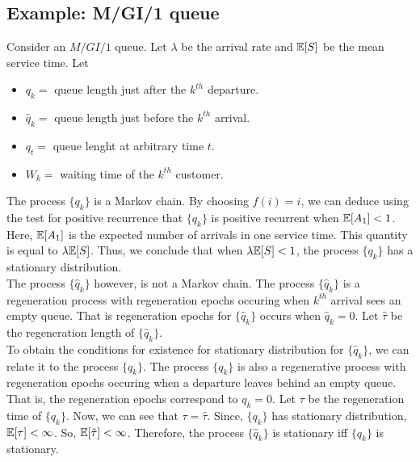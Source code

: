 \documentclass[all-lectures.tex]{subfiles}
\begin{document}

\setcounter{section}{4}
\setcounter{subsection}{0}

\section*{}
\subsection{Example: M/GI/1 queue}
Consider an $M/GI/1$ queue. Let $\lambda$  be the arrival rate and $\mathbb{E}[S]$ be the mean service time. Let 
\begin{itemize}
\item $q_k = $ queue length just after the $k^{th}$ departure. 
\item $\hat{q}_k = $ queue length just before the $k^{th}$ arrival. 
\item $q_t =$ queue lenght at arbitrary time $t$.
\item $W_k = $ waiting time of the $k^{th}$ customer.
\end{itemize}
The process $\{q_k\}$ is a Markov chain. By choosing $f(i) = i$, we can deduce using the test for positive recurrence that $\{q_k\}$ is positive recurrent when $\mathbb{E}[A_1] < 1$. Here, $\mathbb{E}[A_1]$ is the expected number of arrivals in one service time. This quantity is equal to $\lambda \mathbb{E}[S]$. Thus, we conclude that when $\lambda \mathbb{E}[S] < 1$, the process $\{q_k\}$ has a stationary distribution. \\
\indent  The process $\{\hat{q}_k\}$ however, is not a Markov chain. The process $\{\hat{q}_k\}$ is a regeneration process with regeneration epochs occuring when $k^{th}$ arrival sees an empty queue. That is regeneration epochs for $\{\hat{q}_k\}$ occurs when $ \hat{q}_k = 0$. Let $\hat{\tau}$ be the regeneration length of $\{\hat{q}_k\}$. \\
\indent To obtain the conditions for existence for stationary distribution for $\{\hat{q}_k\}$, we can relate it to the process $\{q_k\}$. The process $\{q_k\}$ is also a regenerative process with regeneration epochs occuring when a departure leaves behind an empty queue. That is, the regeneration epochs correspond to $q_k = 0$. Let $\tau$ be the regeneration time of $\{q_k\}$. Now, we can see that $\tau = \hat{\tau}$. Since, $\{q_k\}$ has stationary distribution, $\mathbb{E}[\tau] < \infty$. So, $\mathbb{E}[\hat{\tau}] < \infty$. Therefore, the process $\{\hat{q}_k\}$ is stationary iff $\{q_k\}$ is stationary. \\
\end{document}
